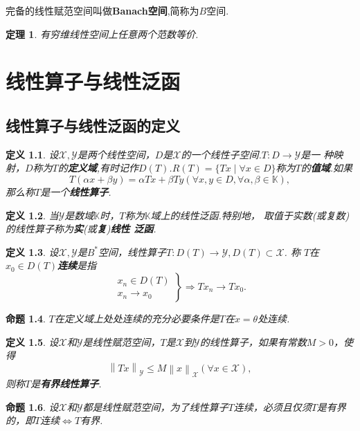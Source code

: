 \documentclass{ctexrep}
\newtheorem{defn}{定义}[section]
\newtheorem{prop}[defn]{命题}
\newtheorem{thm}[defn]{定理}
\newcommand{\X}{\mathscr{X}}
\newcommand{\Y}{\mathscr{Y}}
\newcommand{\K}{\mathbb{K}}
\newcommand{\norm}[1]{\left\lVert#1\right\rVert}
\begin{document}
完备的线性赋范空间叫做\textbf{Banach空间},简称为$B$空间.

\begin{thm}
有穷维线性空间上任意两个范数等价.
\end{thm}


\chapter{线性算子与线性泛函}

\section{线性算子与线性泛函的定义}
\begin{defn}
设$\X,\Y$是两个线性空间，$D$是$\X$的一个线性子空间.$T :　D \to \Y$是一
种映射，$D$称为$T$的\textbf{定义域},有时记作$D(T)$.$R(T) = \{Tx \mid
  \forall x \in D\}$称为$T$的\textbf{值域}.如果
\[
T(\alpha x + \beta y) = \alpha Tx + \beta Ty (\forall x,y \in D,
\forall \alpha,\beta \in \K),
\]
那么称$T$是一个\textbf{线性算子}.
\end{defn}

\begin{defn}
当$\Y$是数域$\K$时，$T$称为$\K$域上的线性泛函.特别地，
取值于实数(或复数)的线性算子称为\textbf{实}(或\textbf{复})\textbf{线性
  泛函}.
\end{defn}

\begin{defn}
设$\X,\Y$是$B^*$空间，线性算子$T : D(T) \to \Y, D(T) \subset \X$. 称
$T$在$x_0 \in D(T)$\textbf{连续}是指
\[
\left.
\begin{array}{l}
x_n \in D(T)\\
x_n \rightarrow x_0
\end{array}
\right\}
\Rightarrow Tx_n \to Tx_0.
\]
\end{defn}

\begin{prop}
$T$在定义域上处处连续的充分必要条件是$T$在$x=\theta$处连续.
\end{prop}

\begin{defn}
设$\X$和$\Y$是线性赋范空间，$T$是$\X$到$\Y$的线性算子，如果有常数$M >
0$，使得
\[
\norm{Tx}_\Y \leq M \norm{x}_\X (\forall x \in \X),
\]
则称$T$是\textbf{有界线性算子}.
\end{defn}

\begin{prop}
设$\X$和$\Y$都是线性赋范空间，为了线性算子$T$连续，必须且仅须$T$是有界
的，即$T$连续$\Leftrightarrow T$有界.
\end{prop}
\end{document}
